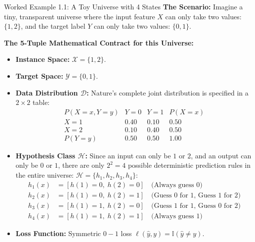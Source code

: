 \begin{examplebox}{Worked Example 1.1: A Toy Universe with 4 States}
\label{ex:w01_toy_universe}
\textbf{The Scenario:}
Imagine a tiny, transparent universe where the input feature $X$ can only take two values: $\{1, 2\}$, and the target label $Y$ can only take two values: $\{0, 1\}$.

\textbf{The 5-Tuple Mathematical Contract for this Universe:}
\begin{itemize}
    \item \textbf{Instance Space:} $\mathcal{X} = \{1, 2\}$.
    \item \textbf{Target Space:} $\mathcal{Y} = \{0, 1\}$.
    \item \textbf{Data Distribution $\mathcal{D}$:} Nature's complete joint distribution is specified in a $2 \times 2$ table:
    \begin{equation*}
    \begin{array}{c|cc|c}
    P(X = x, Y = y) & Y = 0 & Y = 1 & P(X = x) \\
    \hline
    X = 1 & 0.40 & 0.10 & 0.50 \\
    X = 2 & 0.10 & 0.40 & 0.50 \\
    \hline
    P(Y = y) & 0.50 & 0.50 & 1.00
    \end{array}
    \end{equation*}
    \item \textbf{Hypothesis Class $\mathcal{H}$:} Since an input can only be $1$ or $2$, and an output can only be $0$ or $1$, there are only $2^2 = 4$ possible deterministic prediction rules in the entire universe: $\mathcal{H} = \{h_1, h_2, h_3, h_4\}$:
    \begin{equation*}
    \begin{aligned}
    h_1(x) &= [h(1)=0, \; h(2)=0] \quad \text{(Always guess 0)} \\
    h_2(x) &= [h(1)=0, \; h(2)=1] \quad \text{(Guess 0 for 1, Guess 1 for 2)} \\
    h_3(x) &= [h(1)=1, \; h(2)=0] \quad \text{(Guess 1 for 1, Guess 0 for 2)} \\
    h_4(x) &= [h(1)=1, \; h(2)=1] \quad \text{(Always guess 1)}
    \end{aligned}
    \end{equation*}
    \item \textbf{Loss Function:} Symmetric $0-1$ loss $\ell(\hat{y}, y) = \mathbb{I}(\hat{y} \ne y)$.
\end{itemize}


\end{examplebox}
